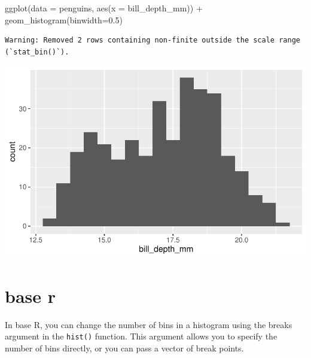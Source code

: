 \documentclass[
  letterpaper,
  DIV=11,
  numbers=noendperiod]{scrreprt}
\newenvironment{Shaded}{\begin{snugshade}}{\end{snugshade}}
\newcommand{\AttributeTok}[1]{\textcolor[rgb]{0.40,0.45,0.13}{#1}}
\newcommand{\CommentTok}[1]{\textcolor[rgb]{0.37,0.37,0.37}{#1}}
\newcommand{\DecValTok}[1]{\textcolor[rgb]{0.68,0.00,0.00}{#1}}
\newcommand{\FloatTok}[1]{\textcolor[rgb]{0.68,0.00,0.00}{#1}}
\newcommand{\FunctionTok}[1]{\textcolor[rgb]{0.28,0.35,0.67}{#1}}
\newcommand{\NormalTok}[1]{\textcolor[rgb]{0.00,0.23,0.31}{#1}}
\newcommand{\SpecialCharTok}[1]{\textcolor[rgb]{0.37,0.37,0.37}{#1}}
\newcommand{\StringTok}[1]{\textcolor[rgb]{0.13,0.47,0.30}{#1}}
\begin{document}
\begin{tcolorbox}
\begin{Shaded}
\begin{Highlighting}[]
\FunctionTok{ggplot}\NormalTok{(}\AttributeTok{data =}\NormalTok{ penguins, }\FunctionTok{aes}\NormalTok{(}\AttributeTok{x =}\NormalTok{ bill\_depth\_mm)) }\SpecialCharTok{+}
  \FunctionTok{geom\_histogram}\NormalTok{(}\AttributeTok{binwidth=}\FloatTok{0.5}\NormalTok{) }
\end{Highlighting}
\end{Shaded}

\begin{verbatim}
Warning: Removed 2 rows containing non-finite outside the scale range
(`stat_bin()`).
\end{verbatim}

\includegraphics{scripts/02_dataViz/class4_files/figure-pdf/widths2-2.pdf}

\section{base r}

In base R, you can change the number of bins in a histogram using the
breaks argument in the \texttt{hist()} function. This argument allows
you to specify the number of bins directly, or you can pass a vector of
break points.

\begin{Shaded}
\end{Shaded}


\end{tcolorbox}
\end{document}
